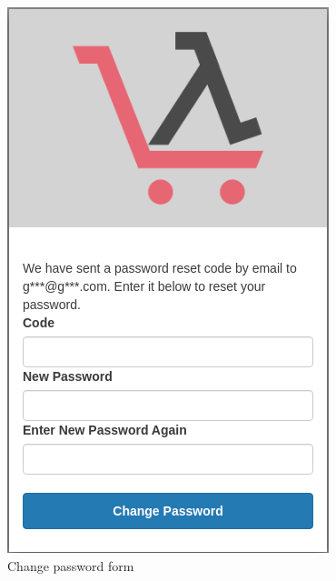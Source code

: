 \begin{figure}[!ht]
    \caption{Change password form}
    \vspace{10px}
    \includegraphics[scale=0.3]{../../../../Images/userManual/changingPWD.png}
    \centering
\end{figure}
\newpage
